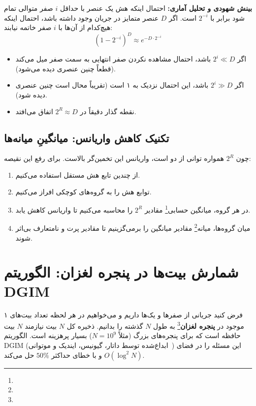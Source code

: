 \textbf{بینش شهودی و تحلیل آماری:}
احتمال اینکه هش یک عنصر با حداقل $i$ صفر متوالی تمام شود برابر با $2^{-i}$ است.
اگر $D$ عنصر متمایز در جریان وجود داشته باشد، احتمال اینکه هیچ‌کدام از آن‌ها با $i$ صفر خاتمه نیابند:
\begin{equation}
(1 - 2^{-i})^D \approx e^{-D \cdot 2^{-i}}
\end{equation}
\begin{itemize}
    \item اگر $2^i \ll D$ باشد، احتمال مشاهده نکردن صفر انتهایی به سمت صفر میل می‌کند (قطعاً چنین عنصری دیده می‌شود).
    \item اگر $2^i \gg D$ باشد، این احتمال نزدیک به ۱ است (تقریباً محال است چنین عنصری دیده شود).
    \item نقطه گذار دقیقاً در $2^R \approx D$ اتفاق می‌افتد.
\end{itemize}

\subsection{تکنیک کاهش واریانس: میانگینِ میانه‌ها \texorpdfstring{}{(Median of Means)}}
چون $2^R$ همواره توانی از دو است، واریانس این تخمین‌گر بالاست. برای رفع این نقیصه:
\begin{enumerate}
    \item از چندین تابع هش مستقل استفاده می‌کنیم.
    \item توابع هش را به گروه‌های کوچکی افراز می‌کنیم.
    \item در هر گروه، میانگین حسابی\footnote{} مقادیر $2^R$ را محاسبه می‌کنیم تا واریانس کاهش یابد.
    \item میان گروه‌ها، میانه\footnote{} مقادیر میانگین را برمی‌گزینیم تا مقادیر پرت و نامتعارف بی‌اثر شوند.
\end{enumerate}

\section{شمارش بیت‌ها در پنجره لغزان: الگوریتم DGIM}
فرض کنید جریانی از صفرها و یک‌ها داریم و می‌خواهیم در هر لحظه تعداد بیت‌های ۱ موجود در \textbf{پنجره لغزان}\footnote{} به طول $N$ گذشته را بدانیم.
ذخیره کل $N$ بیت نیازمند $N$ بیت حافظه است که برای پنجره‌های بزرگ (مثلاً $N = 10^9$) بسیار پرهزینه است. الگوریتم DGIM (ابداع‌شده توسط داتار، گیونیس، ایندیک و موتوانی~\cite{datar2002maintaining}) این مسئله را در فضای $O(\log^2 N)$ و با خطای حداکثر $50\%$ حل می‌کند.

